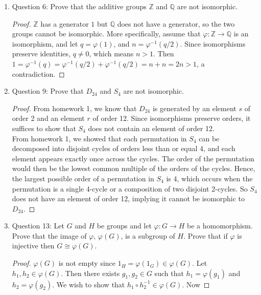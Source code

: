 \documentclass{article}
\begin{document}
\begin{enumerate}
\begin{enumerate}
      \item Question 6: Prove that the additive groups $\mathbb{Z}$ and
        $\mathbb{Q}$ are not isomorphic.

        \begin{proof}
          $\mathbb{Z}$ has a generator $1$ but $\mathbb{Q}$ does not have a
          generator, so the two groups cannot be isomorphic. More
          specifically, assume that
          $\varphi:\mathbb{Z}\rightarrow\mathbb{Q}$ is an isomorphism, and
          let $q=\varphi(1)$, and $n=\varphi^{-1}(q/2)$. Since isomorphisms
          preserve identities, $q\neq0$, which means $n>1$. Then
          $1=\varphi^{-1}(q)=\varphi^{-1}(q/2)+\varphi^{-1}(q/2)=n+n=2n>1$,
          a contradiction.
        \end{proof}

      \item Question 9: Prove that $D_{24}$ and $S_4$ are not isomorphic.
        \begin{proof}
          From homework 1, we know that $D_{24}$ is generated by an element
          $s$ of order 2 and an element $r$ of order 12. Since isomorphisms
          preserve orders, it suffices to show that $S_4$ does not contain
          an element of order 12. \\

          From homework 1, we showed that each permutation in $S_4$ can be
          decomposed into disjoint cycles of orders less than or equal 4,
          and each element appears exactly once across the cycles. The
          order of the permutation would then be the lowest common multiple
          of the orders of the cycles. Hence, the largest possible order of
          a permutation in $S_4$ is 4, which occurs when the permutation is
          a single 4-cycle or a composition of two disjoint 2-cycles. So
          $S_4$ does not have an element of order 12, implying it cannot be
          isomorphic to $D_{24}$.
        \end{proof}

      \item Question 13: Let $G$ and $H$ be groups and let
        $\varphi:G\rightarrow H$ be a homomorphism. Prove that the image of
        $\varphi$, $\varphi(G)$, is a subgroup of $H$. Prove that if
        $\varphi$ is injective then $G\cong\varphi(G)$. 

        \begin{proof}
          $\varphi(G)$ is not empty since $1_H=\varphi(1_G)\in\varphi(G)$.
          Let $h_1,h_2\in\varphi(G)$. Then there exists $g_1,g_2\in G$ such
          that $h_1=\varphi(g_1)$ and $h_2=\varphi(g_2)$. We wish to show
          that $h_1\circ h_2^{-1}\in \varphi(G)$. Now 


\end{proof}
\end{enumerate}
\end{enumerate}
\end{document}
